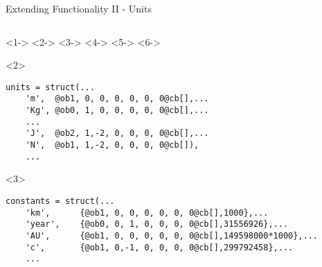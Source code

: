 \begin{frame}[fragile,t]{Extending Functionality II - Units}
\begin{columns}[T]
  \begin{column}{10cm}
    \begin{itemize}
      <1->
      <2->
      <3->
      <4->
      <5->
      <6->
    \end{itemize}
    \begin{onlyenv}<2>
      \begin{Verbatim}[commandchars=@\[\]]
  units = struct(...
    'm',  @ob1, 0, 0, 0, 0, 0, 0@cb[],...
    'Kg', @ob0, 1, 0, 0, 0, 0, 0@cb[],...
    ...
    'J',  @ob2, 1,-2, 0, 0, 0, 0@cb[],...
    'N',  @ob1, 1,-2, 0, 0, 0, 0@cb[]),
    ...
        \end{Verbatim}
      \end{onlyenv}
    \begin{onlyenv}<3>
      \begin{Verbatim}[commandchars=@\[\]]
  constants = struct(...
    'km',      {@ob1, 0, 0, 0, 0, 0, 0@cb[],1000},...
    'year',    {@ob0, 0, 1, 0, 0, 0, 0@cb[],31556926},...
    'AU',      {@ob1, 0, 0, 0, 0, 0, 0@cb[],149598000*1000},...
    'c',       {@ob1, 0,-1, 0, 0, 0, 0@cb[],299792458},...
    ...
        \end{Verbatim}
      \end{onlyenv}
    \end{column}
  \end{columns}
\end{frame}










